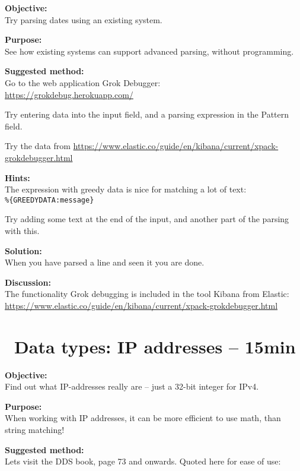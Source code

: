 \documentclass[a4paper,11pt,notitlepage]{report}
\begin{document}

{\bf Objective:}\\
Try parsing dates using an existing system.

{\bf Purpose:}\\
See how existing systems can support advanced parsing, without programming.

{\bf Suggested method:}\\
Go to the web application Grok Debugger:\\
\url{https://grokdebug.herokuapp.com/}

Try entering data into the input field, and a parsing expression in the Pattern field.

Try the data from
\url{https://www.elastic.co/guide/en/kibana/current/xpack-grokdebugger.html}



{\bf Hints:}\\
The expression with greedy data is nice for matching a lot of text:\\
\verb+%{GREEDYDATA:message}+

Try adding some text at the end of the input, and another part of the parsing with this.

{\bf Solution:}\\
When you have parsed a line and seen it you are done.

{\bf Discussion:}\\
The functionality Grok debugging is included in the tool Kibana from Elastic:\\
\url{https://www.elastic.co/guide/en/kibana/current/xpack-grokdebugger.html}





\chapter{\faExclamationTriangle\ Data types: IP addresses -- 15min}
\label{ex:data-types-ip-address}

{\bf Objective:}\\
Find out what IP-addresses really are -- just a 32-bit integer for IPv4.


{\bf Purpose:}\\
When working with IP addresses, it can be more efficient to use math, than string matching!


{\bf Suggested method:}\\
Lets visit the DDS book, page 73 and onwards. Quoted here for ease of use:
\end{document}
